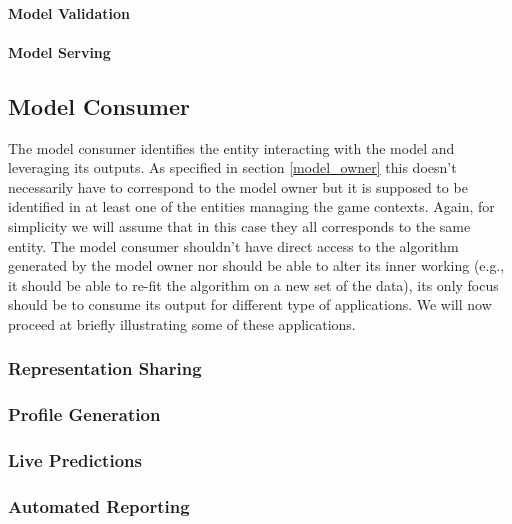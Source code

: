 \paragraph*{Model Validation} \lorem
\paragraph*{Model Serving} \lorem

\subsection{Model Consumer}
The model consumer identifies the entity interacting with the model and leveraging its outputs. As specified in section \ref{model_owner} this doesn't necessarily have to correspond to the model owner but it is supposed to be identified in at least one of the entities managing the game contexts. Again, for simplicity we will assume that in this case they all corresponds to the same entity. The model consumer shouldn't have direct access to the algorithm generated by the model owner nor should be able to alter its inner working (e.g., it should be able to re-fit the algorithm on a new set of the data), its only focus should be to consume its output for different type of applications. We will now proceed at briefly illustrating some of these applications.

\subsubsection{Representation Sharing}
\lorem
\subsubsection{Profile Generation}
\lorem
\subsubsection{Live Predictions}
\lorem
\subsubsection{Automated Reporting}
\lorem
